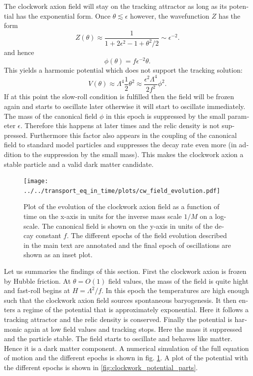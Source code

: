 \documentclass[master,       %
               twoside,        %
               BCOR10mm,       %
               english,ngerman, %
               ]{GAUBM}
\begin{document}
\begin{otherlanguage}{english}
The clockwork axion field will stay on the tracking attractor as long as its potential has the exponential form.
Once $\theta \lesssim \epsilon$ however, the wavefunction $Z$ has the form
\begin{equation}
	Z(\theta) \approx \frac{1}{1 + 2\epsilon^2 - 1 + \theta^2/2} \sim \epsilon^{-2}.
\end{equation}
and hence
\begin{equation}
	\label{eq:small_field_value_relation}
	\phi(\theta) = f \epsilon^{-2} \theta.
\end{equation}
This yields a harmomic potential which does not support the tracking solution:
\begin{equation}
	V(\theta) \approx \Lambda^4 \frac{1}{2} \theta^2 \approx \frac{\epsilon^2 \Lambda^4}{2 f^2} \phi^2.
\end{equation}
If at this point the slow-roll condition is fulfilled then the field will be frozen again and starts to oscillate later otherwise it will start to oscillate immediately.
The mass of the canonical field $\phi$ in this epoch is suppressed by the small parameter $\epsilon$. Therefore this happens at later times and the relic density is not suppressed.
Furthermore this factor also appears in the coupling of the canonical field to standard model particles and suppresses the decay rate even more (in addition to the suppression by the small mass). This makes the clockwork axion a stable particle and a valid dark matter candidate.

\begin{figure}[H]
	\label{fig:evolution_of_clockwork_axion_field}
	\texttt{[image: ../../transport\_eq\_in\_time/plots/cw\_field\_evolution.pdf]}
	\caption{Plot of the evolution of the clockwork axion field as a function of time on the x-axis in units for the inverse mass scale $1/M$ on a log-scale. The canonical field is shown on the y-axis in units of the decay constant $f$. The different epochs of the field evolution described in the main text are annotated and the final epoch of oscillations are shown as an inset plot.}
\end{figure}

Let us summaries the findings of this section.
First the clockwork axion is frozen by Hubble friction. At $\theta = O(1)$ field values, the mass of the field is quite hight and fast-roll begins at $H = \Lambda^2 / f$. In this epoch the temperatures are high enough such that the clockwork axion field sources spontaneous baryogenesis.
It then enters a regime of the potential that is approximately exponential.
Here it follows a tracking attractor and the relic density is conserved.
Finally the potential is harmonic again at low field values and tracking stops.
Here the mass it suppressed and the particle stable.
The field starts to oscillate and behaves like matter. Hence it is a dark matter component. A numerical simulation of the full equation of motion and the different epochs is shown in fig. \ref{fig:evolution_of_clockwork_axion_field}. A plot of the potential with the different epochs is shown in \ref{fig:clockwork_potential_parts}.


\end{otherlanguage}
\end{document}
